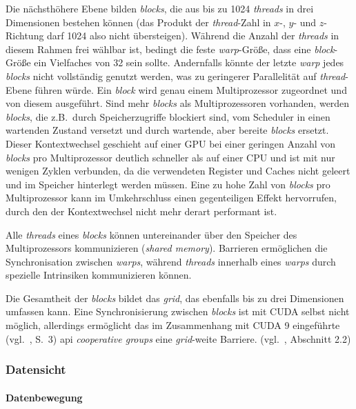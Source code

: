 Die nächsthöhere Ebene bilden \textit{blocks}, die aus bis zu \num{1024}
\textit{threads} in drei Dimensionen bestehen können (das Produkt der
\textit{thread}-Zahl in $x$-, $y$- und $z$-Richtung darf \num{1024} also nicht
übersteigen). Während die Anzahl der \textit{threads} in diesem Rahmen frei
wählbar ist, bedingt die feste \textit{warp}-Größe, dass eine
\textit{block}-Größe ein Vielfaches von 32 sein sollte. Andernfalls könnte
der letzte \textit{warp} jedes \textit{blocks} nicht vollständig genutzt werden,
was zu geringerer Parallelität auf \textit{thread}-Ebene führen würde. Ein
\textit{block} wird genau einem Multiprozessor zugeordnet und von diesem
ausgeführt. Sind mehr \textit{blocks} als Multiprozessoren vorhanden, werden
\textit{blocks}, die z.B.\ durch Speicherzugriffe blockiert sind, vom Scheduler
in einen wartenden Zustand versetzt und durch wartende, aber bereite
\textit{blocks} ersetzt. Dieser Kontextwechsel geschieht auf einer GPU bei einer
geringen Anzahl von \textit{blocks} pro Multiprozessor deutlich schneller als
auf einer CPU und ist mit nur wenigen Zyklen verbunden, da die verwendeten
Register und Caches nicht geleert und im Speicher hinterlegt werden müssen. Eine
zu hohe Zahl von \textit{blocks} pro Multiprozessor kann im Umkehrschluss einen
gegenteiligen Effekt hervorrufen, durch den der Kontextwechsel nicht mehr derart
performant ist.

Alle \textit{threads} eines \textit{blocks} können untereinander über den
Speicher des Multiprozessors kommunizieren (\textit{shared memory}). Barrieren
ermöglichen die Synchronisation zwischen \textit{warps}, während
\textit{threads} innerhalb eines \textit{warps} durch spezielle Intrinsiken
kommunizieren können.

Die Gesamtheit der \textit{blocks} bildet das \textit{grid}, das ebenfalls bis
zu drei Dimensionen umfassen kann. Eine Synchronisierung zwischen
\textit{blocks} ist mit CUDA selbst nicht möglich, allerdings ermöglicht
das im Zusammenhang mit CUDA 9 eingeführte (vgl.~\cite{cuda2018}, S.\ 3)
\gls{api} \textit{cooperative groups} eine \textit{grid}-weite Barriere.
(vgl.~\cite{cudaguide}, Abschnitt 2.2)

\subsubsection{Datensicht}
\label{vergleich:cuda:datensicht}

\paragraph{Datenbewegung}

